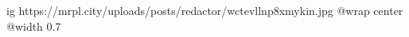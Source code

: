  
 
 
 
 

\ifcmt
  ig https://mrpl.city/uploads/posts/redactor/wctevllnp8xmykin.jpg
  @wrap center
  @width 0.7
\fi
